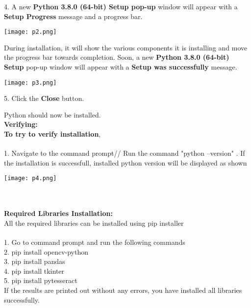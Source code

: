 \documentclass[12pt,a4paper]{report}
\begin{document}
4.
A new \textbf{Python 3.8.0 (64-bit) Setup pop-up} window will appear with a \textbf{Setup Progress} message and a progress bar.

\begin{center}
\texttt{[image: p2.png]}
\end{center}


During installation, it will show the various components it is installing and move the progress bar towards completion. Soon, a new \textbf{Python 3.8.0 (64-bit) Setup} pop-up window will appear with a \textbf{Setup was successfully} message. \\
\begin{center}
\texttt{[image: p3.png]}
\end{center}
5. Click the \textbf{Close} button.

Python should now be installed. \\
\textbf{ Verifying:}\\
\textbf{ To try to verify installation},\\\\
1. Navigate to the command prompt//
Run the command "python --version" . If the installation is successfull, installed python version will be displayed as shown
\begin{center}
\texttt{[image: p4.png]}
\end{center}
\\\\
\textbf{Required Libraries Installation:}\\
All the required libraries can be installed using pip installer\\\\
1. Go to command prompt and run the following commands\\
2. pip install opencv-python\\
3. pip install pandas\\
4. pip install tkinter\\
5. pip install pytesseract\\

If the results are printed out without any errors, you have installed all libraries successfully.
\end{document}
